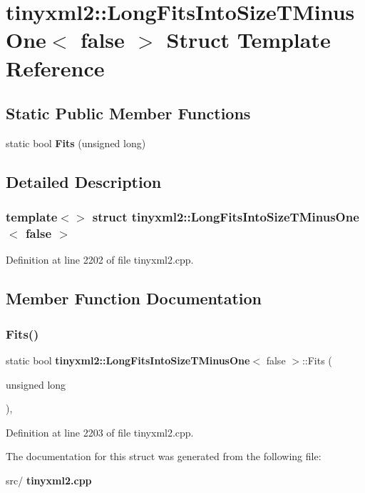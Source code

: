 \section{tinyxml2\+:\+:Long\+Fits\+Into\+Size\+T\+Minus\+One$<$ false $>$ Struct Template Reference}
\label{structtinyxml2_1_1_long_fits_into_size_t_minus_one_3_01false_01_4}
\subsection*{Static Public Member Functions}
\begin{DoxyCompactItemize}
\item 
static bool \textbf{ Fits} (unsigned long)
\end{DoxyCompactItemize}


\subsection{Detailed Description}
\subsubsection*{template$<$$>$\newline
struct tinyxml2\+::\+Long\+Fits\+Into\+Size\+T\+Minus\+One$<$ false $>$}



Definition at line 2202 of file tinyxml2.\+cpp.



\subsection{Member Function Documentation}
\mbox{\label{structtinyxml2_1_1_long_fits_into_size_t_minus_one_3_01false_01_4_a29b01087f38a951276df69d358dc0764}} 
\subsubsection{Fits()}
{\footnotesize\ttfamily static bool \textbf{ tinyxml2\+::\+Long\+Fits\+Into\+Size\+T\+Minus\+One}$<$ false $>$\+::Fits (\begin{DoxyParamCaption}\item[{unsigned}]{long }\end{DoxyParamCaption})\hspace{0.3cm}{\ttfamily [inline]}, {\ttfamily [static]}}



Definition at line 2203 of file tinyxml2.\+cpp.



The documentation for this struct was generated from the following file\+:\begin{DoxyCompactItemize}
\item 
src/\textbf{ tinyxml2.\+cpp}\end{DoxyCompactItemize}
